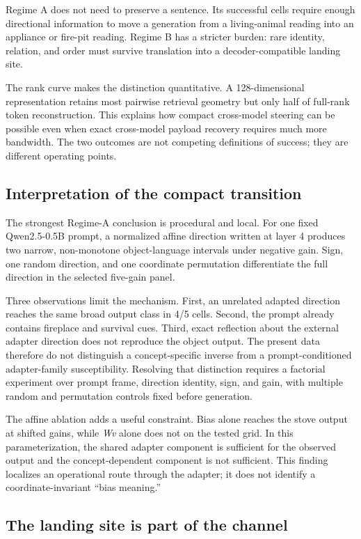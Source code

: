 \documentclass[11pt]{article}
\begin{document}
Regime A does not need to preserve a sentence. Its successful cells require
enough directional information to move a generation from a living-animal
reading into an appliance or fire-pit reading. Regime B has a stricter burden:
rare identity, relation, and order must survive translation into a
decoder-compatible landing site.

The rank curve makes the distinction quantitative. A 128-dimensional
representation retains most pairwise retrieval geometry but only half of
full-rank token reconstruction. This explains how compact cross-model steering
can be possible even when exact cross-model payload recovery requires much more
bandwidth. The two outcomes are not competing definitions of success; they are
different operating points.

\subsection{Interpretation of the compact transition}


The strongest Regime-A conclusion is procedural and local. For one fixed
Qwen2.5-0.5B prompt, a normalized affine direction written at layer 4 produces
two narrow, non-monotone object-language intervals under negative gain. Sign,
one random direction, and one coordinate permutation differentiate the full
direction in the selected five-gain panel.

Three observations limit the mechanism. First, an unrelated adapted direction
reaches the same broad output class in 4/5 cells. Second, the prompt already
contains fireplace and survival cues. Third, exact reflection about the
external adapter direction does not reproduce the object output. The present
data therefore do not distinguish a concept-specific inverse from a
prompt-conditioned adapter-family susceptibility. Resolving that distinction
requires a factorial experiment over prompt frame, direction identity, sign,
and gain, with multiple random and permutation controls fixed before
generation.

The affine ablation adds a useful constraint. Bias alone reaches the stove
output at shifted gains, while \emph{Wv} alone does not on the tested grid. In this
parameterization, the shared adapter component is sufficient for the observed
output and the concept-dependent component is not sufficient. This finding
localizes an operational route through the adapter; it does not identify a
coordinate-invariant ``bias meaning.''

\subsection{The landing site is part of the channel}
\end{document}
